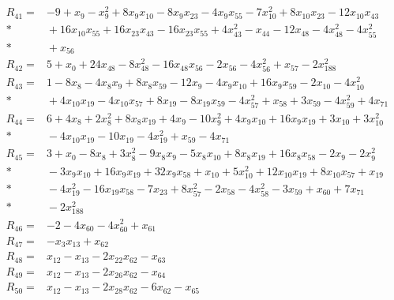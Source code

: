 \begin{align*}
R_{41} ={}& -9 + x_{9} - x_{9}^{2} + 8x_{9}x_{10} - 8x_{9}x_{23} - 4x_{9}x_{55} - 7x_{10}^{2} + 8x_{10}x_{23} - 12x_{10}x_{43} \\*
&{} + 16x_{10}x_{55} + 16x_{23}x_{43} - 16x_{23}x_{55} + 4x_{43}^{2} - x_{44} - 12x_{48} - 4x_{48}^{2} - 4x_{55}^{2} \\*
&{} + x_{56} \\[4pt]
R_{42} ={}& 5 + x_{0} + 24x_{48} - 8x_{48}^{2} - 16x_{48}x_{56} - 2x_{56} - 4x_{56}^{2} + x_{57} - 2x_{188}^{2} \\[4pt]
R_{43} ={}& 1 - 8x_{8} - 4x_{8}x_{9} + 8x_{8}x_{59} - 12x_{9} - 4x_{9}x_{10} + 16x_{9}x_{59} - 2x_{10} - 4x_{10}^{2} \\*
&{} + 4x_{10}x_{19} - 4x_{10}x_{57} + 8x_{19} - 8x_{19}x_{59} - 4x_{57}^{2} + x_{58} + 3x_{59} - 4x_{59}^{2} + 4x_{71} \\[4pt]
R_{44} ={}& 6 + 4x_{8} + 2x_{8}^{2} + 8x_{8}x_{19} + 4x_{9} - 10x_{9}^{2} + 4x_{9}x_{10} + 16x_{9}x_{19} + 3x_{10} + 3x_{10}^{2} \\*
&{} - 4x_{10}x_{19} - 10x_{19} - 4x_{19}^{2} + x_{59} - 4x_{71} \\[4pt]
R_{45} ={}& 3 + x_{0} - 8x_{8} + 3x_{8}^{2} - 9x_{8}x_{9} - 5x_{8}x_{10} + 8x_{8}x_{19} + 16x_{8}x_{58} - 2x_{9} - 2x_{9}^{2} \\*
&{} - 3x_{9}x_{10} + 16x_{9}x_{19} + 32x_{9}x_{58} + x_{10} + 5x_{10}^{2} + 12x_{10}x_{19} + 8x_{10}x_{57} + x_{19} \\*
&{} - 4x_{19}^{2} - 16x_{19}x_{58} - 7x_{23} + 8x_{57}^{2} - 2x_{58} - 4x_{58}^{2} - 3x_{59} + x_{60} + 7x_{71} \\*
&{} - 2x_{188}^{2} \\[4pt]
R_{46} ={}& -2 - 4x_{60} - 4x_{60}^{2} + x_{61} \\[4pt]
R_{47} ={}& -x_{3}x_{13} + x_{62} \\[4pt]
R_{48} ={}& x_{12} - x_{13} - 2x_{22}x_{62} - x_{63} \\[4pt]
R_{49} ={}& x_{12} - x_{13} - 2x_{26}x_{62} - x_{64} \\[4pt]
R_{50} ={}& x_{12} - x_{13} - 2x_{28}x_{62} - 6x_{62} - x_{65} \\[4pt]

\end{align*}

